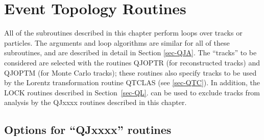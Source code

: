 \chapter{\label{sec-QJ}Event Topology Routines}
\par
All of the subroutines described in this chapter perform loops over
tracks or
particles.
The arguments and loop algorithms are similar
for all of these subroutines, and are described in detail in
Section \ref{sec-QJA}.
The ``tracks'' to be considered are
selected with the routines QJOPTR (for reconstructed tracks) and QJOPTM
(for Monte Carlo tracks); these routines also specify tracks to be
used by the Lorentz transformation routine QTCLAS
(see \ref{sec-QTC}).
In addition, the LOCK routines described in Section~\ref{sec-QL}.
can be used to exclude tracks from analysis by the QJxxxx routines
described in this chapter.
 
\section{\label{sec-QJOP}Options for ``QJxxxx'' routines}
\par
 
